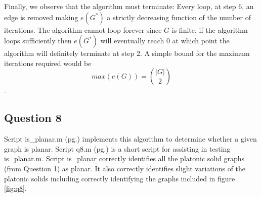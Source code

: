 \documentclass[a4paper]{article}
\begin{document}
Finally, we observe that the algorithm must terminate: Every loop, at step 6, an edge is removed making $e(G^*)$ a strictly decreasing function of the number of iterations. The algorithm cannot loop forever since $G$ is finite, if the algorithm loops sufficiently then $e(G^*)$ will eventually reach 0 at which point the algorithm will definitely terminate at step 2. A simple bound for the maximum iterations required would be
\[ max(e(G)) = {|G|\choose2} \].

\subsection*{Question 8}

Script is\_planar.m (pg.\pageref{Pis_planar}) implements this algorithm to determine whether a given graph is planar. Script q8.m (pg.\pageref{PQ8}) is a short script for assisting in testing is\_planar.m. Script is\_planar correctly identifies all the platonic solid graphs (from Question 1) as planar. It also correctly identifies slight variations of the platonic solids including correctly identifying the graphs included in figure \ref{fig:q8}.
\end{document}
